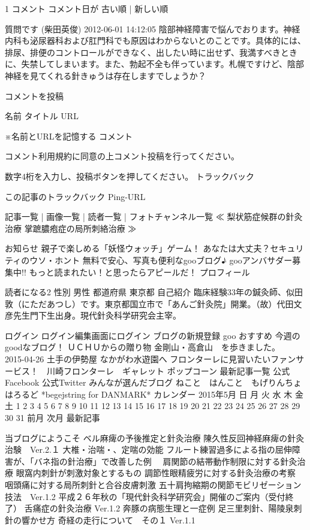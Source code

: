1 コメント
コメント日が  古い順  |   新しい順

質問です (柴田英俊)
    2012-06-01 14:12:05
    陰部神経障害で悩んでおります。神経内科も泌尿器科および肛門科でも原因はわからないとのことです。具体的には、排尿、排便のコントロールができなく、出したい時に出せず、我満すべきときに、失禁してしまいます。また、勃起不全も伴っています。札幌ですけど、陰部神経を見てくれる針きゅうは存在しますでしょうか？

コメントを投稿

名前
タイトル
URL

    ※名前とURLを記憶する
コメント

コメント利用規約に同意の上コメント投稿を行ってください。


数字4桁を入力し、投稿ボタンを押してください。
トラックバック

この記事のトラックバック  Ping-URL

    記事一覧 | 画像一覧 | 読者一覧 | フォトチャンネル一覧
    ≪ 梨状筋症候群の針灸治療
    掌蹠膿疱症の局所刺絡治療 ≫

お知らせ
	親子で楽しめる「妖怪ウォッチ」ゲーム！
	あなたは大丈夫？セキュリティのウソ・ホント
	無料で安心、写真も便利なgooブログ♪
	gooアンバサダー募集中!!
	もっと読まれたい！と思ったらアピールだ！
プロフィール

読者になる2
性別
    男性
都道府県
    東京都
自己紹介
    臨床経験33年の鍼灸師、似田敦（にただあつし）です。東京都国立市で「あんご針灸院」開業。（故）代田文彦先生門下生出身。現代針灸科学研究会主宰。

ログイン
ログイン編集画面にログイン ブログの新規登録
goo おすすめ
今週のgoodなブログ！
	ＵＣＨＵからの贈り物
	金剛山・高倉山　を歩きました。　　　　2015-04-26
	土手の伊勢屋
	なかがわ水遊園へ
	フロンターレに見習いたいファンサービス！　川崎フロンターレ　ギャレット ポップコーン
	最新記事一覧
	公式Facebook
	公式Twitter
みんなが選んだブログ
	ねこと　はんこと　もげりんちょ
	はろるど
	*begejstring for DANMARK*
カレンダー
2015年5月 日 	月 	火 	水 	木 	金 	土
					1 	2
3 	4 	5 	6 	7 	8 	9
10 	11 	12 	13 	14 	15 	16
17 	18 	19 	20 	21 	22 	23
24 	25 	26 	27 	28 	29 	30
31 						
前月
次月
最新記事

    当ブログにようこそ
    ベル麻痺の予後推定と針灸治療
    陳久性反回神経麻痺の針灸治験　Ver.2.１
    大椎・治喘・、定喘の効能
    フルート練習過多による指の屈伸障害が、「バネ指の針治療」で改善した例　
    肩関節の結帯動作制限に対する針灸治療
    眼窩内刺針が刺激対象とするもの
    調節性眼精疲労に対する針灸治療の考察　
    咽頭痛に対する局所刺針と合谷皮膚刺激
    五十肩拘縮期の関節モビリゼーション技法　Ver.1.2
    平成２６年秋の「現代針灸科学研究会」開催のご案内（受付終了）
    舌痛症の針灸治療 Ver.1.2
    奔豚の病態生理と一症例
    足三里刺針、陽陵泉刺針の響かせ方
    奇経の走行について　その１ Ver.1.1

